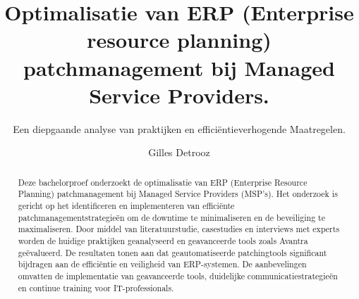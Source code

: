 \documentclass[a0,portrait]{hogent-poster}
\title{Optimalisatie van ERP (Enterprise resource planning) patchmanagement bij Managed Service Providers.}
\subtitle{Een diepgaande analyse van praktijken en efficiëntieverhogende Maatregelen.}
\author{Gilles Detrooz}
\begin{document}
\maketitle

\begin{abstract}
  Deze bachelorproef onderzoekt de optimalisatie van ERP (Enterprise Resource Planning) patchmanagement bij Managed Service Providers (MSP's). Het onderzoek is gericht op het identificeren en implementeren van efficiënte patchmanagementstrategieën om de downtime te minimaliseren en de beveiliging te maximaliseren. Door middel van literatuurstudie, casestudies en interviews met experts worden de huidige praktijken geanalyseerd en geavanceerde tools zoals Avantra geëvalueerd. De resultaten tonen aan dat geautomatiseerde patchingtools significant bijdragen aan de efficiëntie en veiligheid van ERP-systemen. De aanbevelingen omvatten de implementatie van geavanceerde tools, duidelijke communicatiestrategieën en continue training voor IT-professionals.
\end{abstract}
\end{document}
